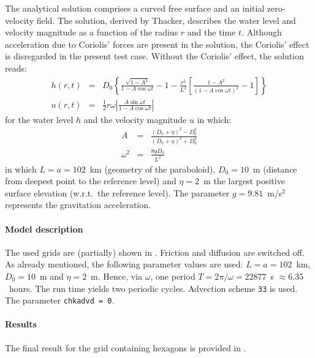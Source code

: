 The analytical solution comprises a curved free surface and an initial zero-velocity field. The solution, derived by Thacker, describes the water level and velocity magnitude as a function of the radius $r$ and the time $t$. Although acceleration due to Coriolis' forces are present in the solution, the Coriolis' effect is disregarded in the present test case. Without the Coriolis' effect, the solution reads:
\begin{eqnarray*}
h(r,t)  &=& D_0 \left\{ \frac{\sqrt{1-A^2}}{1-A \cos \omega t} - 1 - \frac{r^2}{L^2} \left[ \frac{1-A^2}{\left(1-A \cos \omega t  \right)^2} - 1  \right]  \right\}   \\
u(r,t)  &=&  \frac{1}{2} r \omega  \left| \frac{ A \sin \omega t}{1-A \cos \omega t }  \right|
\end{eqnarray*}
for the water level $h$ and the velocity magnitude $u$ in which:
\begin{eqnarray*}
A  &=&  \frac{(D_0 + \eta)^2 - D_0^2}{(D_0 + \eta)^2 + D_0^2}  \\
\omega^2  &=&  \frac{8 g D_0}{L^2}
\end{eqnarray*}
in which $L = a = 102$~km (geometry of the paraboloid), $D_0 = 10$~m (distance from deepest point to the reference level) and $\eta = 2$~m the largest positive surface elevation (w.r.t.\ the reference level). The parameter $g = 9.81$~m/s$^2$ represents the gravitation acceleration.



\paragraph*{Model description}
The used grids are (partially) shown in . Friction and diffusion are switched off. As already mentioned, the following parameter values are used: $L = a = 102$~km, $D_0 = 10$~m and $\eta = 2$~m. Hence, via $\omega$, one period $T = 2 \pi / \omega = 22877$~s $\approx 6.35$~hours. The run time yields two periodic cycles. Advection scheme \texttt{33} is used. The parameter \texttt{chkadvd = 0}.



\paragraph*{Results}
The final result for the grid containing hexagons is provided in . 

